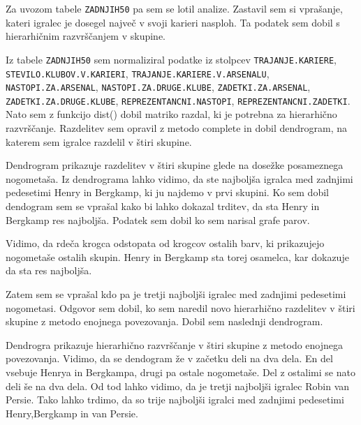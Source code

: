 \documentclass[11pt,a4paper]{article}
\begin{document}
Za uvozom tabele \verb|ZADNJIH50| pa sem se lotil analize. Zastavil sem si vprašanje, kateri igralec je dosegel največ v svoji karieri nasploh. Ta podatek sem dobil s hierarhičnim razvrščanjem v skupine.

Iz tabele \verb|ZADNJIH50| sem normaliziral podatke iz stolpcev \verb|TRAJANJE.KARIERE|, \verb|STEVILO.KLUBOV.V.KARIERI|, \verb|TRAJANJE.KARIERE.V.ARSENALU|, \verb|NASTOPI.ZA.ARSENAL|, \verb|NASTOPI.ZA.DRUGE.KLUBE|, \verb|ZADETKI.ZA.ARSENAL|,  \verb|ZADETKI.ZA.DRUGE.KLUBE|, \verb|REPREZENTANCNI.NASTOPI|, \verb|REPREZENTANCNI.ZADETKI|. Nato sem z funkcijo dist() dobil matriko razdal, ki je potrebna za hierarhično razvrščanje. Razdelitev sem opravil z metodo complete in dobil dendrogram, na katerem sem igralce razdelil v štiri skupine.


Dendrogram  prikazuje razdelitev v štiri skupine glede na dosežke posameznega nogometaša.
Iz dendrograma lahko vidimo, da ste najboljša igralca med zadnjimi pedesetimi Henry in Bergkamp, ki ju najdemo v prvi skupini. 
\newpage
\indent Ko sem dobil dendogram sem se vprašal kako bi lahko dokazal trditev, da sta Henry in Bergkamp res najboljša. Podatek sem dobil ko sem narisal grafe parov.


Vidimo, da rdeča krogca odstopata od krogcov ostalih barv, ki prikazujejo nogometaše ostalih skupin. Henry in Bergkamp sta torej osamelca, kar dokazuje da sta res najboljša.
\newpage

Zatem sem se vprašal kdo pa je tretji najboljši igralec med zadnjimi pedesetimi nogometasi. Odgovor sem dobil, ko sem naredil novo hierarhično razdelitev v štiri skupine z metodo enojnega povezovanja. Dobil sem naslednji dendrogram.


Dendrogra prikazuje hierarhično razvrščanje v štiri skupine z metodo enojnega povezovanja. Vidimo, da se dendogram že v začetku deli na dva dela. En del vsebuje Henrya in Bergkampa, drugi pa ostale nogometaše. Del z ostalimi se nato deli še na dva dela. Od tod lahko vidimo, da je tretji najboljši igralec Robin van Persie. Tako lahko trdimo, da so trije najboljši igralci med zadnjimi pedesetimi Henry,Bergkamp in van Persie.
\end{document}
